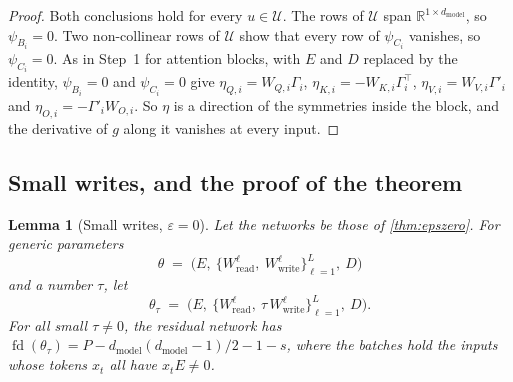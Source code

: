 \documentclass[10pt]{article}
\newtheorem{lemma}[theorem]{Lemma}
\theoremstyle{definition}
\theoremstyle{remark}
\newcommand{\R}{\mathbb{R}}
\newcommand{\Wread}{W_{\mathrm{read}}}
\newcommand{\Wwrite}{W_{\mathrm{write}}}
\newcommand{\dm}{d_{\mathrm{model}}}
\begin{document}
\begin{proof}
Both conclusions hold for every $u \in \mathcal U$. The rows of $\mathcal U$ span $\R^{1\times\dm}$, so $\psi_{B_i} = 0$. Two non-collinear rows of $\mathcal U$ show that every row of $\psi_{C_i}$ vanishes, so $\psi_{C_i} = 0$. As in Step~1 for attention blocks, with $E$ and $D$ replaced by the identity, $\psi_{B_i} = 0$ and $\psi_{C_i} = 0$ give $\eta_{Q,i} = W_{Q,i}\Gamma_i$, $\eta_{K,i} = -W_{K,i}\Gamma_i^\top$, $\eta_{V,i} = W_{V,i}\Gamma'_i$ and $\eta_{O,i} = -\Gamma'_iW_{O,i}$. So $\eta$ is a direction of the symmetries inside the block, and the derivative of $g$ along it vanishes at every input.
\end{proof}

\subsection{Small writes, and the proof of the theorem}\label{app:smallwrites0}

\begin{lemma}[Small writes, $\varepsilon = 0$]\label{lem:smallwrites0}
Let the networks be those of \cref{thm:epszero}. For generic parameters
\[
\theta \;=\; \Big(E,\ \big\{\Wread^{\ell},\ \Wwrite^{\ell}\big\}_{\ell=1}^{L},\ D\Big)
\]
and a number $\tau$, let
\[
\theta_\tau \;=\; \Big(E,\ \big\{\Wread^{\ell},\ \tau\,\Wwrite^{\ell}\big\}_{\ell=1}^{L},\ D\Big).
\]
For all small $\tau \neq 0$, the residual network has $\operatorname{fd}(\theta_\tau) = P - \dm(\dm-1)/2 - 1 - s$, where the batches hold the inputs whose tokens $x_t$ all have $x_tE \neq 0$.
\end{lemma}
\end{document}
